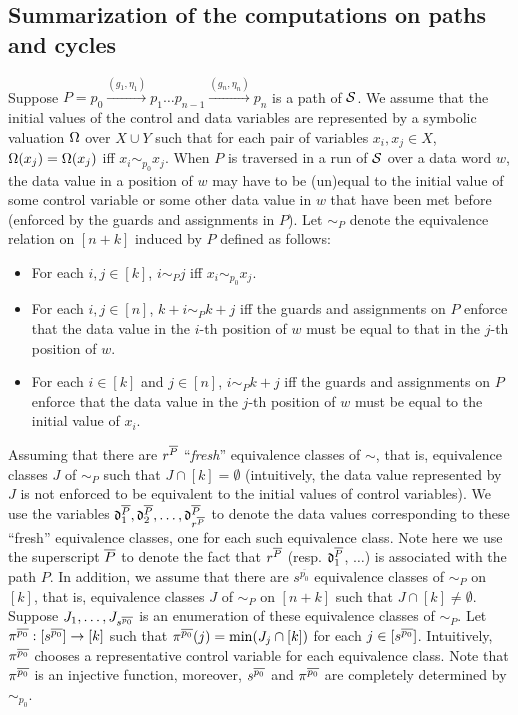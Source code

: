 
\subsection{Summarization of the computations on paths and cycles}\label{sec-sum}

Suppose $P=p_0 \xrightarrow{(g_1,\eta_1)} p_1 \dots p_{n-1} \xrightarrow{(g_n,\eta_n)} p_{n}$ is a path of ${\mathcal{S} }$. We assume that the initial values of the control and data variables are represented by a symbolic valuation $\Omega$ over $X \cup Y$ such that for each pair of variables $x_i, x_j \in X$, $\Omega(x_j)=\Omega(x_j)$ iff $x_i \sim_{p_0} x_j$. When $P$ is traversed in a run of ${\mathcal{S} }$ over a data word $w$,  the data value in a position of $w$ may have to be (un)equal to the initial value of some control variable or some other data value in $w$ that have been met before (enforced by the guards and assignments in $P$). Let $\sim_P$ denote the equivalence relation on $[n+k]$ induced by $P$ defined as follows: 
\begin{itemize}
\item For each $i, j \in [k]$, $i \sim_P j$ iff $x_i \sim_{p_0} x_j$.
%
\item For each $i, j \in [n]$, $k+i \sim_P k+j$ iff the guards and assignments on $P$ enforce that the data value in the $i$-th position of $w$ must be equal to that in the $j$-th position of $w$.
%
\item For each $i \in [k]$ and $j \in [n]$, $i \sim_P k+j$ iff the guards and assignments on $P$ enforce that the data value in the $j$-th position of $w$ must be equal to the initial value of $x_i$. 
\end{itemize}
Assuming that there are $r^{\overline{P}}$ ``\emph{fresh}'' equivalence classes of $\sim$, that is, equivalence classes $J$ of $\sim_P$ such that $J \cap [k] = \emptyset$ (intuitively, the data value represented by $J$ is not enforced to be equivalent to the initial values of control variables). 
We use the variables $\mathfrak{d}^{\overline{P}}_1,\mathfrak{d}^{\overline{P}}_2,\dots, \mathfrak{d}^{\overline{P}}_{r^{\overline{P}}}$ to denote the data values corresponding to these ``fresh'' equivalence classes, one for each such equivalence class. Note here we use the superscript ${\overline{P}}$ to denote the fact that $r^{\overline{P}}$ (resp. $\mathfrak{d}^{\overline{P}}_1$, $\dots$) is associated with the path $P$. In addition, we assume that there are $s^{\overline{p_0}}$ equivalence classes of $\sim_P$ on $[k]$, that is, equivalence classes $J$ of $\sim_P$ on $[n+k]$ such that $J \cap [k] \neq \emptyset$. Suppose $J_1,\dots, J_{s^{\overline{p_0}}}$ is an enumeration of these equivalence classes of $\sim_P$. Let $\pi^{\overline{p_0}}: [s^{\overline{p_0}}] \rightarrow [k]$ such that $\pi^{\overline{p_0}}(j) = \min(J_j \cap [k])$ for each $j \in [s^{\overline{p_0}}]$. Intuitively, $\pi^{\overline{p_0}}$ chooses a representative control variable for each equivalence class. Note that $\pi^{\overline{p_0}}$ is an injective function, moreover, $s^{\overline{p_0}}$ and $\pi^{\overline{p_0}}$ are completely determined by $\sim_{p_0}$.
